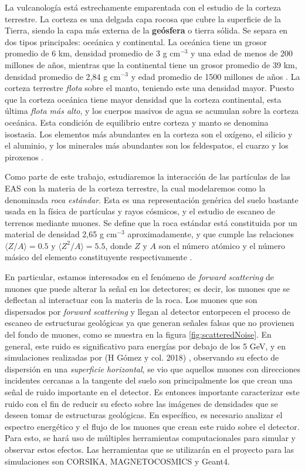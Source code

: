 \documentclass[12pt]{report}
\begin{document}
La vulcanología está estrechamente emparentada con el estudio de la corteza terrestre. La corteza es una delgada capa rocosa que cubre la superficie de la Tierra, siendo la capa más externa de la \textbf{geósfera} o tierra sólida. Se separa en dos tipos principales: oceánica y continental. La oceánica tiene un grosor promedio de 6 km, densidad promedio de 3 g cm$^{-3}$ y una edad de menos de 200 millones de años, mientras que la continental tiene un grosor promedio de 39 km, densidad promedio de 2,84 g cm$^{-3}$ y edad promedio de 1500 millones de años \cite{mooney20101}. La corteza terrestre \textit{flota} sobre el manto, teniendo este una densidad mayor. Puesto que la corteza oceánica tiene mayor densidad que la corteza continental, esta última \textit{flota más alto}, y los cuerpos masivos de agua se acumulan sobre la corteza oceánica. Esta condición de equilibrio entre corteza y manto se denomina isostasia. Los elementos más abundantes en la corteza son el oxígeno, el silicio y el aluminio, y los minerales más abundantes son los feldespatos, el cuarzo y los piroxenos \cite{anderson2010geomorphology}.

Como parte de este trabajo, estudiaremos la interacción de las partículas de las EAS con la materia de la corteza terrestre, la cual modelaremos como la denominada \textit{roca estándar}. Esta es una representación genérica del suelo bastante usada en la física de partículas y rayos cósmicos, y el estudio de escaneo de terrenos mediante muones. Se define que la roca estándar está constituida por un material de densidad 2,65 g cm$^{-3}$ aproximadamente, y que cumple las relaciones $\langle Z/A \rangle=0.5$ y $\langle Z^2/A \rangle=5.5$, donde $Z$ y $A$ son el número atómico y el número másico del elemento constituyente respectivamente \cite{groom2001muon}.

En particular, estamos interesados en el fenómeno de \textit{forward scattering} de muones que puede alterar la señal en los detectores; es decir, los muones que se deflectan al interactuar con la materia de la roca. Los muones que son dispersados por \textit{forward scattering} y llegan al detector entorpecen el proceso de escaneo de estructuras geológicas ya que generan señales falsas que no provienen del fondo de muones, como se muestra en la figura \ref{fig:scatteredNoise}. En general, este ruido es significativo para energías por debajo de los 5 GeV, y en simulaciones realizadas por (H Gómez y col. 2018) \cite{gomez2017forward}, observando su efecto de dispersión en una \textit{superficie horizontal}, se vio que aquellos muones con direcciones incidentes cercanas a la tangente del suelo son principalmente los que crean una señal de ruido importante en el detector. Es entonces importante caracterizar este ruido con el fin de reducir su efecto sobre las imágenes de densidades que se deseen tomar de estructuras geológicas. En específico, es necesario analizar el espectro energético y el flujo de los muones que crean este ruido sobre el detector. Para esto, se hará uso de múltiples herramientas computacionales para simular y observar estos efectos. Las herramientas que se utilizarán en el proyecto para las simulaciones son CORSIKA, MAGNETOCOSMICS y Geant4.
\end{document}

